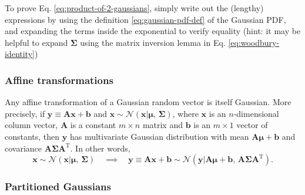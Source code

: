 To prove Eq. \eqref{eq:product-of-2-gaussians}, simply write out the (lengthy) expressions by using the definition \eqref{eq:gaussian-pdf-def} of the Gaussian PDF, and expanding the terms inside the exponential to verify equality (hint: it may be helpful to expand $\boldsymbol{\Sigma}$ using the matrix inversion lemma in Eq. \eqref{eq:woodbury-identity}) 

\subsubsection{Affine transformations}

Any affine transformation of a Gaussian random vector is itself Gaussian. More precisely, if $\mathbf{y} \equiv \mathbf{A}\mathbf{x} + \mathbf{b}$ and $\mathbf{x} \sim \mathcal{N}(\mathbf{x}|\boldsymbol{\mu},\, \boldsymbol{\Sigma})$, where $\mathbf{x}$ is an $n$-dimensional column vector, $\mathbf{A}$ is a constant $m\times n$ matrix and $\mathbf{b}$ is an $m\times 1$ vector of constants, then $\mathbf{y}$ has multivariate Gaussian distribution with mean $\mathbf{A}\boldsymbol{\mu} + \mathbf{b}$ and covariance $\mathbf{A}\boldsymbol{\Sigma}\mathbf{A}^\text{T}$. In other words,
\begin{equation}
	\mathbf{x} \sim \mathcal{N}(\mathbf{x}|\boldsymbol{\mu},\, \boldsymbol{\Sigma})
	\quad \implies \quad
	\mathbf{y} \equiv \mathbf{A}\mathbf{x} + \mathbf{b}
	\sim \mathcal{N}(\mathbf{y}|\mathbf{A}\boldsymbol{\mu} + \mathbf{b},\, \mathbf{A}\boldsymbol{\Sigma}\mathbf{A}^\text{T}).
\end{equation}

\subsubsection{Partitioned Gaussians}


